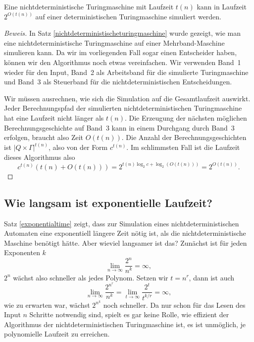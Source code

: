 \begin{satz}
\label{exponentialtime}
Eine nichtdeterministische Turingmaschine mit Laufzeit $t(n)$
kann in Laufzeit $2^{O(t(n))}$
auf einer deterministischen Turingmaschine simuliert werden.
\end{satz}

\begin{proof}[Beweis]
In Satz \ref{nichtdeterministischeturingmaschine} wurde gezeigt,
wie man eine nichtdeterministische Turingmaschine auf einer
Mehrband-Maschine simulieren kann. Da wir im vorliegenden Fall
sogar einen Entscheider haben, können wir den Algorithmus noch
etwas vereinfachen. Wir verwenden Band~1 wieder für den Input,
Band~2 als Arbeitsband für die simulierte Turingmaschine und
Band~3 als Steuerband für die nichtdeterministischen
Entscheidungen.

Wir müssen ausrechnen, wie sich die Simulation auf die 
Gesamtlaufzeit auswirkt. Jeder Berechnungspfad der simulierten
nichtdeterministischen Turingmaschine hat eine Laufzeit nicht
länger als $t(n)$. Die Erzeugung der nächsten möglichen
Berechnungsgeschichte auf Band~3 kann in einem Durchgang
durch Band~3 erfolgen, braucht also Zeit $O(t(n))$.
Die Anzahl der Berechnungsgeschichten ist $|Q\times \Gamma|^{t(n)}$,
also von der Form $c^{t(n)}$. Im schlimmsten Fall ist die
Laufzeit dieses Algorithmus also
\[
c^{t(n)}(t(n) + O(t(n)))
=
2^{t(n) \log_2 c+ \log_2(O(t(n)))}
=
2^{O(t(n))}.
\]
\end{proof}
\subsection{Wie langsam ist exponentielle Laufzeit?}
%
Satz \ref{exponentialtime} zeigt, dass zur Simulation eines
nichtdeterministischen Automaten eine exponentiell längere
Zeit nötig ist, als die nichtdeterministische Maschine
benötigt hätte. Aber wieviel langsamer ist das?
Zunächst ist für jeden Exponenten $k$
\[
\lim_{n\to\infty}\frac{2^{n}}{n^k}=\infty,
\]
$2^n$ wächst also schneller als jedes Polynom. 
Setzen wir $t=n^r$, dann ist auch
\[
\lim_{n\to\infty}\frac{2^{n^r}}{n^k}
=
\lim_{t\to\infty}\frac{2^t}{t^{k/r}}
=
\infty,
\]
wie zu erwarten war, wächst $2^{n^k}$ noch schneller.
Da nur schon für das Lesen des Input $n$ Schritte notwendig sind,
spielt es gar keine Rolle, wie effizient der Algorithmus der
nichtdeterministischen Turingmaschine ist, es ist unmöglich,
je polynomielle Laufzeit zu erreichen.

